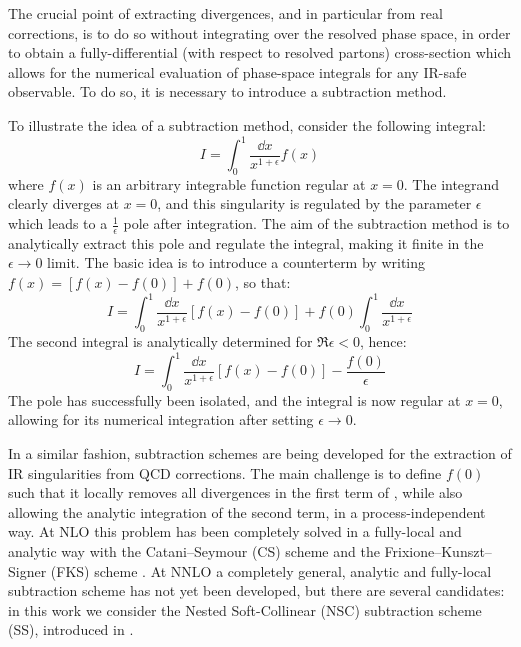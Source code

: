 The crucial point of extracting divergences, and in particular from real corrections, is to do so without integrating over the resolved phase space, in order to obtain a fully-differential (with respect to resolved partons) cross-section which allows for the numerical evaluation of phase-space integrals for any IR-safe observable. To do so, it is necessary to introduce a subtraction method.

To illustrate the idea of a subtraction method, consider the following integral:
\begin{equation}
  I = \int_0^1 \frac{\dd x}{x^{1 + \epsilon}} f(x)
\end{equation}
where $ f(x) $ is an arbitrary integrable function regular at $ x = 0 $. The integrand clearly diverges at $ x = 0 $, and this singularity is regulated by the parameter $ \epsilon $ which leads to a $ \frac{1}{\epsilon} $ pole after integration. The aim of the subtraction method is to analytically extract this pole and regulate the integral, making it finite in the $ \epsilon \rightarrow 0 $ limit. The basic idea is to introduce a counterterm by writing $ f(x) = [f(x) - f(0)] + f(0) $, so that:
\begin{equation*}
  I = \int_0^1 \frac{\dd x}{x^{1 + \epsilon}} \left[ f(x) - f(0) \right] + f(0) \int_0^1 \frac{\dd x}{x^{1 + \epsilon}}
\end{equation*}
The second integral is analytically determined for $ \Re{\epsilon} < 0 $, hence:
\begin{equation}
  I = \int_0^1 \frac{\dd x}{x^{1 + \epsilon}} \left[ f(x) - f(0) \right] - \frac{f(0)}{\epsilon}
  \label{eq:reg-i}
\end{equation}
The pole has successfully been isolated, and the integral is now regular at $ x = 0 $, allowing for its numerical integration after setting $ \epsilon \rightarrow 0 $.

In a similar fashion, subtraction schemes are being developed for the extraction of IR singularities from QCD corrections. The main challenge is to define $ f(0) $ such that it locally removes all divergences in the first term of , while also allowing the analytic integration of the second term, in a process-independent way. At NLO this problem has been completely solved in a fully-local and analytic way with the Catani--Seymour (CS) scheme \cite{Catani-1997} and the Frixione--Kunszt--Signer (FKS) scheme \cite{Frixione-1996, Frixione-1997}. At NNLO a completely general, analytic and fully-local subtraction scheme has not yet been developed, but there are several candidates: in this work we consider the Nested Soft-Collinear (NSC) subtraction scheme (SS), introduced in \cite{rontsch-2017}.


